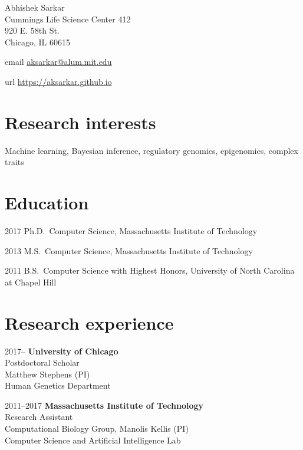 \documentclass{article}
\begin{document}
{\LARGE Abhishek Sarkar\vspace{1em}}\\
Cummings Life Science Center 412\\
920 E. 58th St.\\
Chicago, IL 60615\vspace{1em}

\begin{hdesc}
\item[email] \url{aksarkar@alum.mit.edu}
\item[url] \url{https://aksarkar.github.io}
\end{hdesc}

\section*{Research interests}
Machine learning, Bayesian inference, regulatory genomics, epigenomics, complex traits

\section*{Education}
\begin{hdesc}
\item[2017] Ph.D.\ Computer Science, Massachusetts Institute of Technology
\item[2013] M.S.\ Computer Science, Massachusetts Institute of Technology
\item[2011] B.S.\ Computer Science with Highest Honors, University of North
  Carolina at Chapel Hill
\end{hdesc}

\section*{Research experience}
\begin{hdesc}[itemsep=1em]
\item[2017--] \textbf{University of Chicago}\\
Postdoctoral Scholar\\
Matthew Stephens (PI)\\
Human Genetics Department
\end{hdesc}
\begin{hdesc}[itemsep=1em]
\item[2011--2017] \textbf{Massachusetts Institute of Technology}\\
Research Assistant\\
Computational Biology Group, Manolis Kellis (PI)\\
Computer Science and Artificial Intelligence Lab
\end{hdesc}
\end{document}
